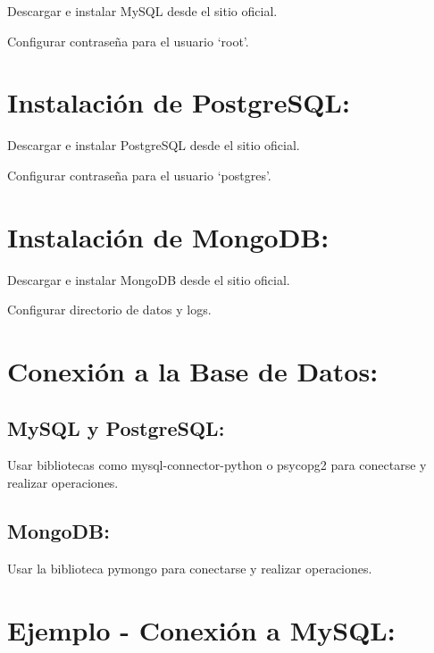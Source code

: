 \documentclass[
  a4paper,
  DIV=11,
  numbers=noendperiod,
  onepage,
  openany]{scrreprt}
\begin{document}
Descargar e instalar MySQL desde el sitio oficial.

Configurar contraseña para el usuario `root'.

\hypertarget{instalaciuxf3n-de-postgresql-2}{%
\section{Instalación de
PostgreSQL:}\label{instalaciuxf3n-de-postgresql-2}}

Descargar e instalar PostgreSQL desde el sitio oficial.

Configurar contraseña para el usuario `postgres'.

\hypertarget{instalaciuxf3n-de-mongodb-2}{%
\section{Instalación de MongoDB:}\label{instalaciuxf3n-de-mongodb-2}}

Descargar e instalar MongoDB desde el sitio oficial.

Configurar directorio de datos y logs.

\hypertarget{conexiuxf3n-a-la-base-de-datos}{%
\section{Conexión a la Base de
Datos:}\label{conexiuxf3n-a-la-base-de-datos}}

\hypertarget{mysql-y-postgresql}{%
\subsection{MySQL y PostgreSQL:}\label{mysql-y-postgresql}}

Usar bibliotecas como mysql-connector-python o psycopg2 para conectarse
y realizar operaciones.

\hypertarget{mongodb}{%
\subsection{MongoDB:}\label{mongodb}}

Usar la biblioteca pymongo para conectarse y realizar operaciones.

\hypertarget{ejemplo---conexiuxf3n-a-mysql}{%
\section{Ejemplo - Conexión a
MySQL:}\label{ejemplo---conexiuxf3n-a-mysql}}
\end{document}
